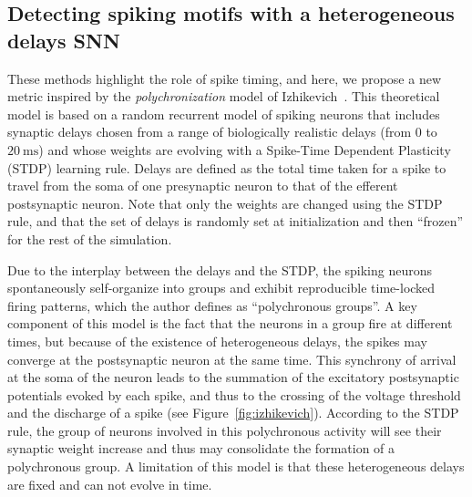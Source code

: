 \documentclass[runningheads]{llncs}
\newcommand{\ms}{\si{\milli\second}}%
\begin{document}
\subsection{Detecting spiking motifs with a heterogeneous delays SNN}
%
These methods highlight the role of spike timing, and here, we propose a new metric inspired by the \textit{polychronization} model of Izhikevich~\cite{izhikevich_polychronization_2006}. This theoretical model is based on a random recurrent model of spiking neurons that includes synaptic delays chosen from a range of biologically realistic delays (from $0$ to $20~\ms$) and whose weights are evolving with a Spike-Time Dependent Plasticity (STDP) learning rule. Delays are defined as the total time taken for a spike to travel from the soma of one presynaptic neuron to that of the efferent postsynaptic neuron. Note that only the weights are changed using the STDP rule, and that the set of delays is randomly set at initialization and then ``frozen'' for the rest of the simulation. 

Due to the interplay between the delays and the STDP, the spiking neurons spontaneously self-organize into groups and %
exhibit reproducible time-locked firing patterns, which the author defines as ``polychronous groups''. A key component of this model is the fact that the neurons in a group fire at different times, but because of the existence of heterogeneous delays, the spikes may converge at the postsynaptic neuron at the same time. This synchrony of arrival at the soma of the neuron leads to the summation of the excitatory postsynaptic potentials evoked by each spike, and thus to the crossing of the voltage threshold and the discharge of a spike (see Figure~\ref{fig:izhikevich}). According to the STDP rule, the group of neurons involved in this polychronous activity will see their synaptic weight increase and thus may consolidate the formation of a polychronous group.  A limitation of this model is that these heterogeneous delays are fixed and can not evolve in time.
\end{document}
